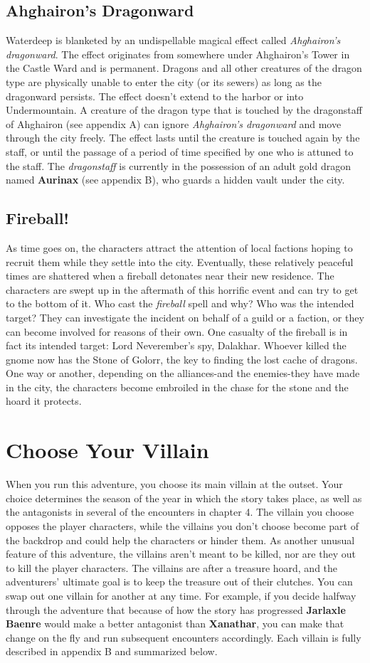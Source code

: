 \documentclass[10pt,a4paper,twoside,twocolumn,openany,nodeprecatedcode]{dndbook}
\begin{document}
\subsection{Ahghairon's Dragonward}
Waterdeep is blanketed by an undispellable magical effect called \textit{Ahghairon's dragonward}. The effect originates from somewhere under Ahghairon's Tower in the Castle Ward and is permanent. Dragons and all other creatures of the dragon type are physically unable to enter the city (or its sewers) as long as the dragonward persists. The effect doesn't extend to the harbor or into Undermountain.
A creature of the dragon type that is touched by the dragonstaff of Ahghairon (see appendix A) can ignore \textit{Ahghairon's dragonward} and move through the city freely. The effect lasts until the creature is touched again by the staff, or until the passage of a period of time specified by one who is attuned to the staff.
The \textit{dragonstaff} is currently in the possession of an adult gold dragon named \textbf{Aurinax} (see appendix B), who guards a hidden vault under the city.
\subsection{Fireball!}
As time goes on, the characters attract the attention of local factions hoping to recruit them while they settle into the city. Eventually, these relatively peaceful times are shattered when a fireball detonates near their new residence. The characters are swept up in the aftermath of this horrific event and can try to get to the bottom of it. Who cast the \textit{fireball} spell and why? Who was the intended target? They can investigate the incident on behalf of a guild or a faction, or they can become involved for reasons of their own.
One casualty of the fireball is in fact its intended target: Lord Neverember's spy, Dalakhar. Whoever killed the gnome now has the Stone of Golorr, the key to finding the lost cache of dragons. One way or another, depending on the alliances-and the enemies-they have made in the city, the characters become embroiled in the chase for the stone and the hoard it protects.
\section{Choose Your Villain}
When you run this adventure, you choose its main villain at the outset. Your choice determines the season of the year in which the story takes place, as well as the antagonists in several of the encounters in chapter 4. The villain you choose opposes the player characters, while the villains you don't choose become part of the backdrop and could help the characters or hinder them.
As another unusual feature of this adventure, the villains aren't meant to be killed, nor are they out to kill the player characters. The villains are after a treasure hoard, and the adventurers' ultimate goal is to keep the treasure out of their clutches.
You can swap out one villain for another at any time. For example, if you decide halfway through the adventure that because of how the story has progressed \textbf{Jarlaxle Baenre} would make a better antagonist than \textbf{Xanathar}, you can make that change on the fly and run subsequent encounters accordingly.
Each villain is fully described in appendix B and summarized below.
\end{document}

